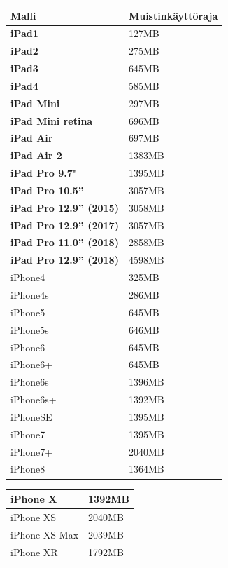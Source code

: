 \documentclass[utf8]{gradu3}
\begin{document}
\begin{center}
    \begin{tabular}{| l | l |}
    \hline
    \textbf{Malli} & \textbf{Muistinkäyttöraja} \\ \hline
    \textbf{iPad1} & 127MB  \\ \hline
    \textbf{iPad2} & 275MB \\ \hline
    \textbf{iPad3} & 645MB \\ \hline
    \textbf{iPad4} & 585MB \\ \hline
    \textbf{iPad Mini} & 297MB \\ \hline
    \textbf{iPad Mini retina} & 696MB \\ \hline
    \textbf{iPad Air} & 697MB \\ \hline
    \textbf{iPad Air 2} & 1383MB \\ \hline
    \textbf{iPad Pro 9.7"} & 1395MB  \\ \hline
    \textbf{iPad Pro 10.5”} & 3057MB \\ \hline
    \textbf{iPad Pro 12.9” (2015)} & 3058MB \\ \hline
    \textbf{iPad Pro 12.9” (2017)} & 3057MB \\ \hline
    \textbf{iPad Pro 11.0” (2018)} & 2858MB \\ \hline
    \textbf{iPad Pro 12.9” (2018)} & 4598MB \\ \hline
    iPhone4 & 325MB \\ \hline
    iPhone4s & 286MB \\ \hline
    iPhone5 & 645MB \\ \hline
    iPhone5s & 646MB \\ \hline
    iPhone6 & 645MB \\ \hline
    iPhone6+ & 645MB \\ \hline
    iPhone6s & 1396MB \\ \hline
    iPhone6s+ & 1392MB \\ \hline
    iPhoneSE & 1395MB \\ \hline
    iPhone7 & 1395MB \\ \hline
    iPhone7+ & 2040MB \\ \hline
    iPhone8 & 1364MB \\ \hline 
    \end{tabular}
\end{center}

\begin{center}
    \begin{tabular}{| l | l |}
    \hline
    iPhone X & 1392MB \\ \hline
    iPhone XS & 2040MB \\ \hline
    iPhone XS Max & 2039MB \\ \hline
    iPhone XR & 1792MB \\ \hline   
    \end{tabular}
\end{center}
\end{document}
